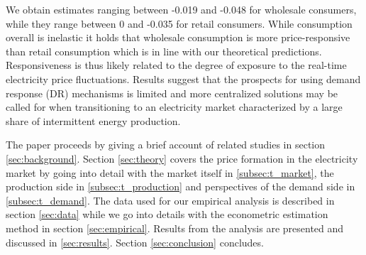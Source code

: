 \par 
We obtain estimates ranging between -0.019 and -0.048 for wholesale consumers, while they range between 0 and -0.035 for retail consumers.  While consumption overall is inelastic it holds that wholesale consumption is more price-responsive than retail consumption which is in line with our theoretical predictions. Responsiveness is thus likely related to the degree of exposure to the real-time electricity price fluctuations. Results suggest that the prospects for using demand response (DR) mechanisms is limited and more centralized solutions may be called for when transitioning to an electricity market characterized by a large share of intermittent energy production.  \bigskip \par
The paper proceeds by giving a brief account of related studies in section \ref{sec:background}. Section \ref{sec:theory} covers the price formation in the electricity market by going into detail with the market itself in \ref{subsec:t_market}, the production side in \ref{subsec:t_production} and perspectives of the demand side in \ref{subsec:t_demand}. The data used for our empirical analysis is described in section \ref{sec:data} while we go into details with the econometric estimation method in section \ref{sec:empirical}. Results from the analysis are presented and discussed in \ref{sec:results}. Section \ref{sec:conclusion} concludes.
